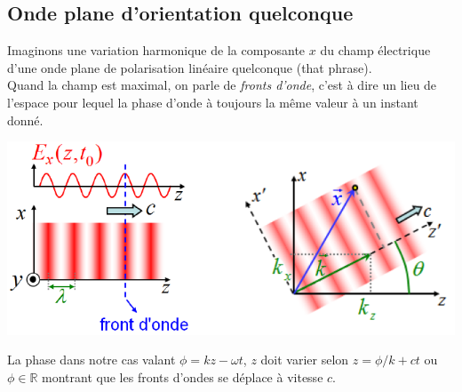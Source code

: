 \documentclass	[11pt, a4paper, openany]{book}
\begin{document}
		\subsection{Onde plane d'orientation quelconque}
		Imaginons une variation harmonique de la composante $x$ du champ électrique d'une onde plane de polarisation linéaire quelconque (that phrase).\\
		Quand la champ est maximal, on parle de \textit{fronts d'onde}, c'est à dire un lieu de l'espace pour lequel la phase d'onde à toujours la même valeur à un instant donné.
		\begin{center}
			\includegraphics[scale=0.4]{oo/image35.png}
		\end{center}
		La phase dans notre cas valant $\phi = kz - \omega t$, $z$ doit varier selon $z = \phi / k + ct$ ou $\phi \in \mathbb{R}$ montrant que les fronts d'ondes se déplace à vitesse $c$.\\
		
\end{document}
